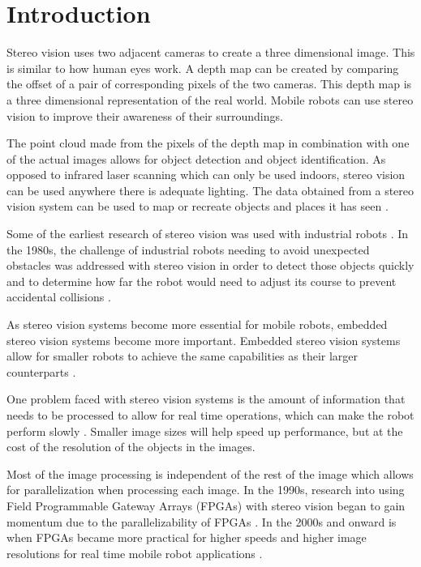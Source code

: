 \chapter{Introduction}
\label{sec:intro}

Stereo vision uses two adjacent cameras to create a three dimensional image. This is similar to how human eyes work. A depth map can be created by comparing the offset of a pair of corresponding pixels of the two cameras. This depth map is a three dimensional representation of the real world. Mobile robots can use stereo vision to improve their awareness of their surroundings.

The point cloud made from the pixels of the depth map in combination with one of the actual images allows for object detection and object identification. As opposed to infrared laser scanning which can only be used indoors, stereo vision can be used anywhere there is adequate lighting. The data obtained from a stereo vision system can be used to map or recreate objects and places it has seen \cite{actStereoMap}.

Some of the earliest research of stereo vision was used with industrial robots \cite{industRobot}. In the 1980s, the challenge of industrial robots needing to avoid unexpected obstacles was addressed with stereo vision in order to detect those objects quickly and to determine how far the robot would need to adjust its course to prevent accidental collisions \cite{3DVision}.

As stereo vision systems become more essential for mobile robots, embedded stereo vision systems become more important. Embedded stereo vision systems allow for smaller robots to achieve the same capabilities as their larger counterparts \cite{xilinxSpartan3ABoard}.

One problem faced with stereo vision systems is the amount of information that needs to be processed to allow for real time operations, which can make the robot perform slowly \cite{nav}. Smaller image sizes will help speed up performance, but at the cost of the resolution of the objects in the images. 

Most of the image processing is independent of the rest of the image which allows for parallelization when processing each image. In the 1990s, research into using Field Programmable Gateway Arrays (FPGAs) with stereo vision began to gain momentum due to the parallelizability of FPGAs \cite{stereoFPGA}. In the 2000s and onward is when FPGAs became more practical for higher speeds and higher image resolutions for real time mobile robot applications \cite{fpga}.

